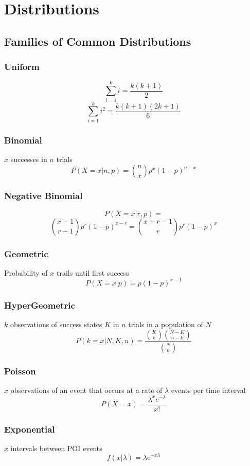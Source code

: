 \section{Distributions}
\subsection*{Families of Common Distributions}
	\subsubsection*{Uniform}
		\[ \sum_{i=1}^{k} i = \frac{k(k+1)}{2} \]
		\[ \sum_{i=1}^{k} i^2 = \frac{k(k+1)(2k+1)}{6} \]
	
	\subsubsection*{Binomial}
		\(x\) successes in \(n\) trials
		\[ P(X=x|n,p) = \binom{n}{x}p^x(1-p)^{n-x}\]
	
	\subsubsection*{Negative Binomial}
		\[P(X=x|r,p) =  \] \[ \binom{x-1}{r-1}p^r(1-p)^{x-r} = \binom{x+r-1}{r}p^r(1-p)^{x} \]
	
	\subsubsection*{Geometric}
		Probability of \(x\) trails until first success
		\[P(X=x|p) = p(1-p)^{x-1}\]
		
	\subsubsection*{HyperGeometric}
		\(k\) observations of success states \(K\)
		in \(n\) trials in a population of \(N\)
		\[P(k=x|N,K,n) = \frac{\binom{K}{k}\binom{N-K}{n-k}}{\binom{N}{n}}\]
	
	\subsubsection*{Poisson}
		\(x\) observations of an event that occurs at a rate of \(\lambda\) events per time interval
		\[P(X=x) = \frac{\lambda^xe^{-\lambda}}{x!}\]
		
	\subsubsection*{Exponential}
		\(x\) intervals between POI events
		\[f(x|\lambda) = \lambda e^{-x\lambda}\]
	

